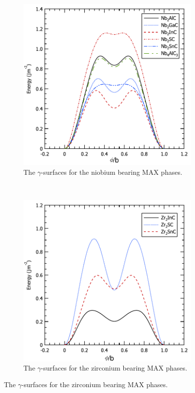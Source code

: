 \begin{figure}[!htb]
\centering
\begin{subfigure}{5cm}
\centering
\includegraphics[width=\textwidth]{Nb_gamma_surfaces}
\caption{The $\gamma$-surfaces for the niobium bearing MAX phases.\label{fig:Nb_gamma_surfaces}}
\end{subfigure}
~
\begin{subfigure}{5cm}
\centering
\includegraphics[width=\textwidth]{Zr_gamma_surfaces}
\caption{The $\gamma$-surfaces for the zirconium bearing MAX phases.\label{fig:Zr_gamma_surfaces}}
\end{subfigure}


\end{figure}
